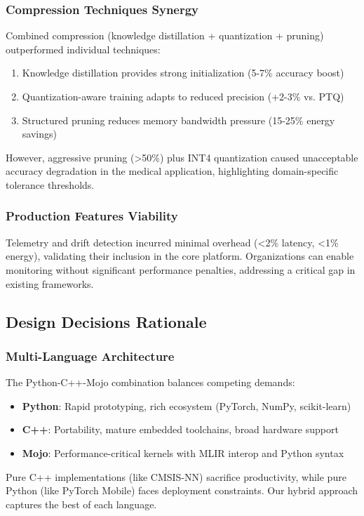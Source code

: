 \subsubsection{Compression Techniques Synergy}
Combined compression (knowledge distillation + quantization + pruning) outperformed individual techniques:
\begin{enumerate}
\item Knowledge distillation provides strong initialization (5-7\% accuracy boost)
\item Quantization-aware training adapts to reduced precision (+2-3\% vs. PTQ)
\item Structured pruning reduces memory bandwidth pressure (15-25\% energy savings)
\end{enumerate}

However, aggressive pruning (>50\%) plus INT4 quantization caused unacceptable accuracy degradation in the medical application, highlighting domain-specific tolerance thresholds.

\subsubsection{Production Features Viability}
Telemetry and drift detection incurred minimal overhead (<2\% latency, <1\% energy), validating their inclusion in the core platform. Organizations can enable monitoring without significant performance penalties, addressing a critical gap in existing frameworks.

\subsection{Design Decisions Rationale}

\subsubsection{Multi-Language Architecture}
The Python-C++-Mojo combination balances competing demands:
\begin{itemize}
\item \textbf{Python}: Rapid prototyping, rich ecosystem (PyTorch, NumPy, scikit-learn)
\item \textbf{C++}: Portability, mature embedded toolchains, broad hardware support
\item \textbf{Mojo}: Performance-critical kernels with MLIR interop and Python syntax
\end{itemize}

Pure C++ implementations (like CMSIS-NN) sacrifice productivity, while pure Python (like PyTorch Mobile) faces deployment constraints. Our hybrid approach captures the best of each language.


